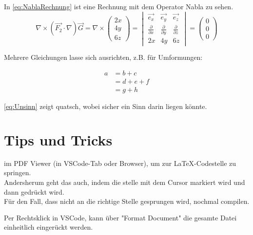 In \cref{eq:NablaRechnung} ist eine Rechnung mit dem Operator Nabla zu sehen.
\begin{equation}
    \nabla \times\left(\overrightarrow{F_2} \cdot \nabla\right) \overrightarrow{G}
    =
    \nabla \times
    \begin{pmatrix}
        2x \\ 4y\\ 6z
    \end{pmatrix}
    =
    \begin{vmatrix}
        \overrightarrow{e_x}        & \overrightarrow{e_y}        & \overrightarrow{e_z}        \\
        \frac{\partial}{\partial x} & \frac{\partial}{\partial y} & \frac{\partial}{\partial z} \\
        2x                          & 4y                          & 6z
    \end{vmatrix}
    =
    \begin{pmatrix}
        0 \\ 0 \\ 0
    \end{pmatrix}
    \label{eq:NablaRechnung}
\end{equation}

Mehrere Gleichungen lasse sich ausrichten, z.B. für Umformungen:
\begin{figure}[H]
    \begin{align}
        a & = b + c     \\
          & = d + e + f \\
          & = g + h
        \label{eq:Unsinn}
    \end{align}
\end{figure}
\cref{eq:Unsinn} zeigt quatsch, wobei sicher ein Sinn darin liegen könnte.


\chapter{Tips und Tricks}
 im PDF Viewer (in VSCode-Tab oder Browser), um zur \LaTeX-Codestelle zu springen. \\
Andersherum geht das auch, indem die stelle mit dem Cursor markiert wird und dann  gedrückt wird. \\
Für den Fall, dass nicht an die richtige Stelle gesprungen wird, nochmal compilen.

Per Rechtsklick in VSCode, kann über "Format Document" die gesamte Datei einheitlich eingerückt werden.